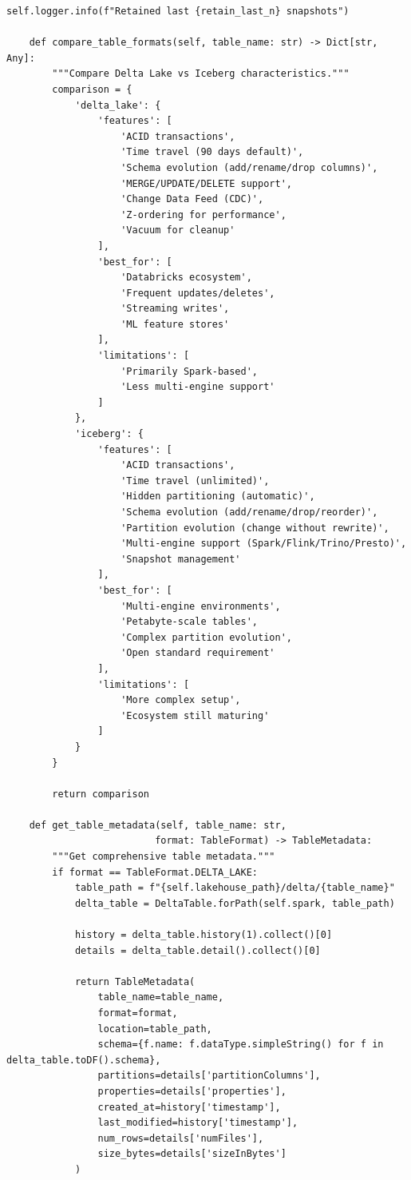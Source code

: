 \begin{lstlisting}[style=python, caption=LakehouseIntegrator with Modern Table Formats]
            self.logger.info(f"Retained last {retain_last_n} snapshots")

    def compare_table_formats(self, table_name: str) -> Dict[str, Any]:
        """Compare Delta Lake vs Iceberg characteristics."""
        comparison = {
            'delta_lake': {
                'features': [
                    'ACID transactions',
                    'Time travel (90 days default)',
                    'Schema evolution (add/rename/drop columns)',
                    'MERGE/UPDATE/DELETE support',
                    'Change Data Feed (CDC)',
                    'Z-ordering for performance',
                    'Vacuum for cleanup'
                ],
                'best_for': [
                    'Databricks ecosystem',
                    'Frequent updates/deletes',
                    'Streaming writes',
                    'ML feature stores'
                ],
                'limitations': [
                    'Primarily Spark-based',
                    'Less multi-engine support'
                ]
            },
            'iceberg': {
                'features': [
                    'ACID transactions',
                    'Time travel (unlimited)',
                    'Hidden partitioning (automatic)',
                    'Schema evolution (add/rename/drop/reorder)',
                    'Partition evolution (change without rewrite)',
                    'Multi-engine support (Spark/Flink/Trino/Presto)',
                    'Snapshot management'
                ],
                'best_for': [
                    'Multi-engine environments',
                    'Petabyte-scale tables',
                    'Complex partition evolution',
                    'Open standard requirement'
                ],
                'limitations': [
                    'More complex setup',
                    'Ecosystem still maturing'
                ]
            }
        }

        return comparison

    def get_table_metadata(self, table_name: str,
                          format: TableFormat) -> TableMetadata:
        """Get comprehensive table metadata."""
        if format == TableFormat.DELTA_LAKE:
            table_path = f"{self.lakehouse_path}/delta/{table_name}"
            delta_table = DeltaTable.forPath(self.spark, table_path)

            history = delta_table.history(1).collect()[0]
            details = delta_table.detail().collect()[0]

            return TableMetadata(
                table_name=table_name,
                format=format,
                location=table_path,
                schema={f.name: f.dataType.simpleString() for f in delta_table.toDF().schema},
                partitions=details['partitionColumns'],
                properties=details['properties'],
                created_at=history['timestamp'],
                last_modified=history['timestamp'],
                num_rows=details['numFiles'],
                size_bytes=details['sizeInBytes']
            )


\end{lstlisting}

